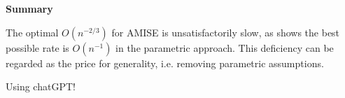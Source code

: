 \documentclass[19pt,landscape]{article}
\begin{document}
\newpage
{\LARGE\centerline{\textbf{Summary}}}
\vskip25pt
\begin{minipage}{.9\textwidth}
    \Large 
    The optimal $O(n^{-2/3})$ for AMISE is unsatisfactorily slow, as \cite{boydsteele78} shows the best possible rate is $O(n^{-1})$ in the parametric approach. This deficiency can be regarded as the price for generality, i.e. removing parametric assumptions.  

    \vskip 10pt
    {\huge Using chatGPT!}
\end{minipage}

\newpage



    
    
    
    
    
    
    
    
    
\end{document}
